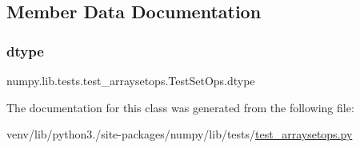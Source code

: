\subsection{Member Data Documentation}
\mbox{\label{classnumpy_1_1lib_1_1tests_1_1test__arraysetops_1_1TestSetOps_ab64154312f93c094960389a390ae7cf8}} 
\subsubsection{\texorpdfstring{dtype}{dtype}}
{\footnotesize\ttfamily numpy.\+lib.\+tests.\+test\+\_\+arraysetops.\+Test\+Set\+Ops.\+dtype\hspace{0.3cm}{\ttfamily [static]}}



The documentation for this class was generated from the following file\+:\begin{DoxyCompactItemize}
\item 
venv/lib/python3./site-\/packages/numpy/lib/tests/\hyperlink{test__arraysetops_8py}{test\+\_\+arraysetops.\+py}\end{DoxyCompactItemize}

